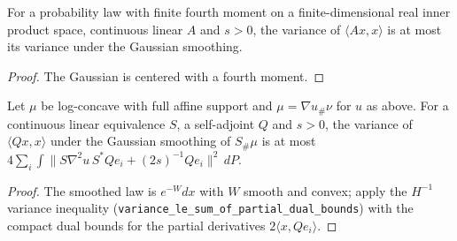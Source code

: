 \begin{lemma}
  \label{lem:gaussian-smoothing-quadratic-variance}
  \leanok
  For a probability law with finite fourth moment on a finite-dimensional real inner product space, continuous linear $A$
  and $s>0$, the variance of $\langle Ax,x\rangle$ is at most its variance under the Gaussian smoothing.
\end{lemma}
\begin{proof}
  \leanok
  The Gaussian is centered with a fourth moment.
\end{proof}

\begin{lemma}
  \label{lem:gaussian-smoothed-quadratic-h-minus-one}
  \leanok
  Let $\mu$ be log-concave with full affine support and $\mu=\nabla u_\#\nu$ for $u$ as above. For a continuous linear
  equivalence $S$, a self-adjoint $Q$ and $s>0$, the variance of $\langle Qx,x\rangle$ under the Gaussian smoothing of
  $S_\#\mu$ is at most $4\sum_i\int\|S\nabla^2u\,S^{*}Qe_i+(2s)^{-1}Qe_i\|^2\,dP$.
\end{lemma}
\begin{proof}
  \leanok
  The smoothed law is $e^{-W}dx$ with $W$ smooth and convex; apply the $H^{-1}$ variance inequality
  (\texttt{variance\_le\_sum\_of\_partial\_dual\_bounds}) with the compact dual bounds for the partial derivatives
  $2\langle x,Qe_i\rangle$.
\end{proof}

